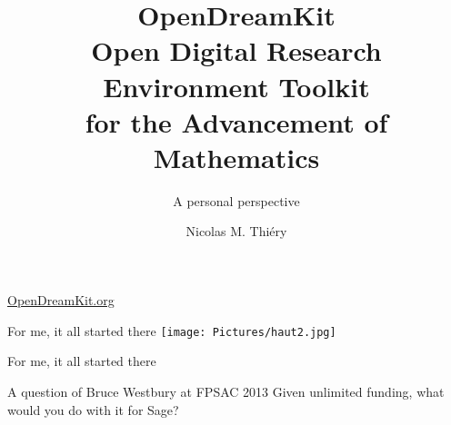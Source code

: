 \documentclass[
  usenames,svgnames, %
  compress,
  ]{beamer}
\title{{\huge \color{red} OpenDreamKit}\\
  Open Digital Research Environment Toolkit\\
  for the Advancement of Mathematics\\}
\subtitle{A personal perspective}
\begin{document}
\author{Nicolas M. Thiéry}
\begin{frame}
  \maketitle

  \Huge
  \centerline{\url{OpenDreamKit.org}}
\end{frame}

\begin{frame}{For me, it all started there}
  \texttt{[image: Pictures/haut2.jpg]}
\end{frame}

%
%



\begin{frame}{For me, it all started there}

  \begin{block}{A question of Bruce Westbury at FPSAC 2013}
    Given unlimited funding, what would you do with it for Sage?
  \end{block}

\end{frame}
\end{document}
